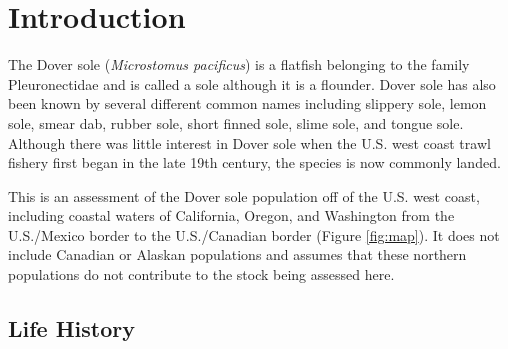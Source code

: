 \documentclass[11pt,
  english,
  a4paper,
]{article}
\begin{document}
\pagebreak
\setlength{\parskip}{5mm plus1mm minus1mm}
\setcounter{page}{1}
\renewcommand{\thefigure}{\arabic{figure}}
\renewcommand{\thetable}{\arabic{table}}

\setcounter{table}{0}
\setcounter{figure}{0}

\setlength\parskip{0.5em plus 0.1em minus 0.2em}


\hypertarget{introduction}{%
\section{Introduction}\label{introduction}}

\leavevmode\tagmcend\tagstructend


The Dover sole (\emph{Microstomus pacificus}) is a flatfish belonging to the family Pleuronectidae and is called a sole although it is a flounder. Dover sole has also been known by several different common names including slippery sole, lemon sole, smear dab, rubber sole, short finned sole, slime sole, and tongue sole. Although there was little interest in Dover sole when the U.S. west coast trawl fishery first began in the late 19th century, the species is now commonly landed.

\leavevmode\tagmcend\tagstructend\par


This is an assessment of the Dover sole population off of the U.S. west coast, including coastal waters of California, Oregon, and Washington from the U.S./Mexico border to the U.S./Canadian border (Figure \ref{fig:map}). It does not include Canadian or Alaskan populations and assumes that these northern populations do not contribute to the stock being assessed here.

\leavevmode\tagmcend\tagstructend\par


\hypertarget{life-history}{%
\subsection{Life History}\label{life-history}}

\leavevmode\tagmcend\tagstructend
\end{document}

